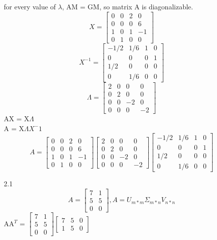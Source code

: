 \documentclass[12pt]{article}
\begin{document}
\begin{enumerate}[label=\alph*)]
for every value of $\lambda$,  AM = GM,
so matrix A is diagonalizable.
\[
X = \begin{bmatrix} 0 & 0 & 2 & 0\\0 & 0 & 0 & 6\\1 & 0 & 1 & -1\\0 & 1 & 0 & 0\end{bmatrix}
\]
\[
X^{-1} = \begin{bmatrix} -1/2 & 1/6 & 1 & 0\\0 & 0 & 0 & 1\\1/2 & 0 & 0 & 0\\0 & 1/6 & 0 & 0\end{bmatrix}
\]
\[
\Lambda = \begin{bmatrix} 2 & 0 & 0 & 0\\0 & 2 & 0 & 0\\0 & 0 & -2 & 0\\0 & 0 & 0 & -2\end{bmatrix}
\]
AX = X$\Lambda$\\
A = X$\Lambda$$X^-1$
\[
A = \begin{bmatrix} 0 & 0 & 2 & 0\\0 & 0 & 0 & 6\\1 & 0 & 1 & -1\\0 & 1 & 0 & 0\end{bmatrix}\begin{bmatrix} 2 & 0 & 0 & 0\\0 & 2 & 0 & 0\\0 & 0 & -2 & 0\\0 & 0 & 0 & -2\end{bmatrix}\begin{bmatrix} -1/2 & 1/6 & 1 & 0\\0 & 0 & 0 & 1\\1/2 & 0 & 0 & 0\\0 & 1/6 & 0 & 0\end{bmatrix}
\]
\newpage
\item[2.1]
\[
A = \begin{bmatrix} 7 & 1\\5 & 5\\0 & 0\end{bmatrix},
A = U_{m*m}\Sigma_{m*n}V_{n*n}
\]
AA$^T$ = $\begin{bmatrix} 7 & 1\\5 & 5\\0 & 0\end{bmatrix}$$\begin{bmatrix} 7 & 5 & 0\\1 & 5 & 0\end{bmatrix}$

\end{enumerate}
\end{document}
